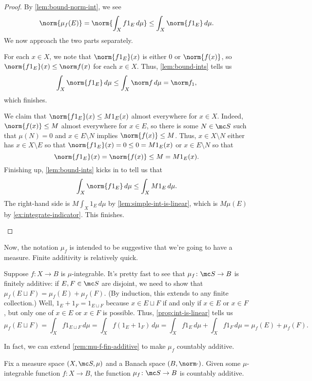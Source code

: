 \documentclass[../notes.tex]{subfiles}
\begin{document}
\begin{proof}
	By \autoref{lem:bound-norm-int}, we see
	\[\norm{\mu_f(E)}=\norm{\int_Xf1_E\,d\mu}\le\int_X\norm{f1_E}\,d\mu.\]
	We now approach the two parts separately.
	\begin{listalph}
		\item For each $x\in X$, we note that $\norm{f1_E}(x)$ is either $0$ or $\norm{f(x)}$, so $\norm{f1_E}(x)\le\norm f(x)$ for each $x\in X$. Thus, \autoref{lem:bound-ints} tells us
		\[\int_X\norm{f1_E}\,d\mu\le\int_X\norm f\,d\mu=\norm f_1,\]
		which finishes.
		\item We claim that $\norm{f1_E}(x)\le M1_E(x)$ almost everywhere for $x\in X$. Indeed, $\norm{f(x)}\le M$ almost everywhere for $x\in E$, so there is some $N\in\mc S$ such that $\mu(N)=0$ and $x\in E\setminus N$ implies $\norm{f(x)}\le M$. Thus, $x\in X\setminus N$ either has $x\in X\setminus E$ so that $\norm{f1_E}(x)=0\le0=M1_E(x)$ or $x\in E\setminus N$ so that
		\[\norm{f1_E}(x)=\norm{f(x)}\le M=M1_E(x).\]
		Finishing up, \autoref{lem:bound-ints} kicks in to tell us that
		\[\int_X\norm{f1_E}\,d\mu\le\int_XM1_E\,d\mu.\]
		The right-hand side is $M\int_X1_E\,d\mu$ by \autoref{lem:simple-int-is-linear}, which is $M\mu(E)$ by \autoref{ex:integrate-indicator}. This finishes.
		\qedhere
	\end{listalph}
\end{proof}
Now, the notation $\mu_f$ is intended to be suggestive that we're going to have a measure. Finite additivity is relatively quick.
\begin{remark} \label{rem:mu-f-fin-additive}
	Suppose $f\colon X\to B$ is $\mu$-integrable. It's pretty fast to see that $\mu_f\colon\mc S\to B$ is finitely additive: if $E,F\in\mc S$ are disjoint, we need to show that $\mu_f(E\sqcup F)=\mu_f(E)+\mu_f(F)$. (By induction, this extends to any finite collection.) Well, $1_E+1_F=1_{E\sqcup F}$ because $x\in E\sqcup F$ if and only if $x\in E$ or $x\in F$, but only one of $x\in E$ or $x\in F$ is possible. Thus, \autoref{prop:int-is-linear} tells us
	\[\mu_f(E\sqcup F)=\int_Xf1_{E\sqcup F}\,d\mu=\int_Xf(1_E+1_F)\,d\mu=\int_Xf1_E\,d\mu+\int_Xf1_F\,d\mu=\mu_f(E)+\mu_f(F).\]
\end{remark}
In fact, we can extend \autoref{rem:mu-f-fin-additive} to make $\mu_f$ countably additive.
\begin{proposition} \label{prop:int-gives-measure}
	Fix a measure space $(X,\mc S,\mu)$ and a Banach space $(B,\norm\cdot)$. Given some $\mu$-integrable function $f\colon X\to B$, the function $\mu_f\colon\mc S\to B$ is countably additive.
\end{proposition}
\end{document}
